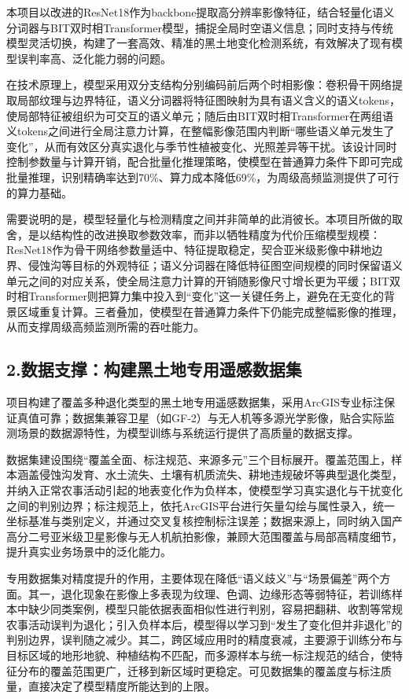 \documentclass[12pt, a4paper]{ctexart}
\begin{document}
本项目以改进的ResNet18作为backbone提取高分辨率影像特征，结合轻量化语义分词器与BIT双时相Transformer模型，捕捉全局时空语义信息；同时支持与传统模型灵活切换，构建了一套高效、精准的黑土地变化检测系统，有效解决了现有模型误判率高、泛化能力弱的问题。

在技术原理上，模型采用双分支结构分别编码前后两个时相影像：卷积骨干网络提取局部纹理与边界特征，语义分词器将特征图映射为具有语义含义的语义tokens，使局部特征被组织为可交互的语义单元；随后由BIT双时相Transformer在两组语义tokens之间进行全局注意力计算，在整幅影像范围内判断“哪些语义单元发生了变化”，从而有效区分真实退化与季节性植被变化、光照差异等干扰。该设计同时控制参数量与计算开销，配合批量化推理策略，使模型在普通算力条件下即可完成批量推理，识别精确率达到70\%、算力成本降低69\%，为周级高频监测提供了可行的算力基础。

需要说明的是，模型轻量化与检测精度之间并非简单的此消彼长。本项目所做的取舍，是以结构性的改进换取参数效率，而非以牺牲精度为代价压缩模型规模：ResNet18作为骨干网络参数量适中、特征提取稳定，契合亚米级影像中耕地边界、侵蚀沟等目标的外观特征；语义分词器在降低特征图空间规模的同时保留语义单元之间的对应关系，使全局注意力计算的开销随影像尺寸增长更为平缓；BIT双时相Transformer则把算力集中投入到“变化”这一关键任务上，避免在无变化的背景区域重复计算。三者叠加，使模型在普通算力条件下仍能完成整幅影像的推理，从而支撑周级高频监测所需的吞吐能力。

\subsection{2.数据支撑：构建黑土地专用遥感数据集}

项目构建了覆盖多种退化类型的黑土地专用遥感数据集，采用ArcGIS专业标注保证真值可靠；数据集兼容卫星（如GF-2）与无人机等多源光学影像，贴合实际监测场景的数据源特性，为模型训练与系统运行提供了高质量的数据支撑。

数据集建设围绕“覆盖全面、标注规范、来源多元”三个目标展开。覆盖范围上，样本涵盖侵蚀沟发育、水土流失、土壤有机质流失、耕地违规破坏等典型退化类型，并纳入正常农事活动引起的地表变化作为负样本，使模型学习真实退化与干扰变化之间的判别边界；标注规范上，依托ArcGIS平台进行矢量勾绘与属性录入，统一坐标基准与类别定义，并通过交叉复核控制标注误差；数据来源上，同时纳入国产高分二号亚米级卫星影像与无人机航拍影像，兼顾大范围覆盖与局部高精度细节，提升真实业务场景中的泛化能力。

专用数据集对精度提升的作用，主要体现在降低“语义歧义”与“场景偏差”两个方面。其一，退化现象在影像上多表现为纹理、色调、边缘形态等弱特征，若训练样本中缺少同类案例，模型只能依据表面相似性进行判别，容易把翻耕、收割等常规农事活动误判为退化；引入负样本后，模型得以学习到“发生了变化但并非退化”的判别边界，误判随之减少。其二，跨区域应用时的精度衰减，主要源于训练分布与目标区域的地形地貌、种植结构不匹配，而多源样本与统一标注规范的结合，使特征分布的覆盖范围更广，迁移到新区域时更稳定。可见数据集的覆盖度与标注质量，直接决定了模型精度所能达到的上限。
\end{document}
